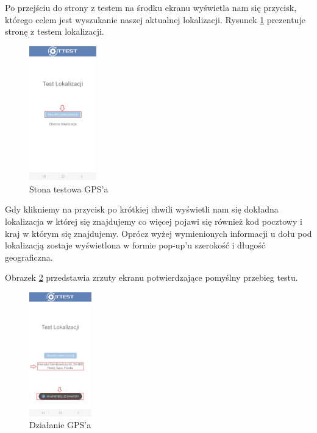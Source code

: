 Po przejściu do strony z testem na środku ekranu  wyświetla nam się przycisk, którego celem jest wyszukanie naszej aktualnej lokalizacji.
\newline
Rysunek \ref{rys:gps} prezentuje stronę z testem lokalizacji. 

\begin{figure}[!hbt]
	\begin{center}
		\includegraphics[angle=360, width=0.26\textwidth]{rys/punkt6/gps}
		\caption{Stona testowa GPS'a}
		\label{rys:gps}
	\end{center}
\end{figure}

\newpage


Gdy klikniemy na przycisk po krótkiej chwili wyświetli nam się dokładna lokalizacja w której się znajdujemy co więcej pojawi się również kod pocztowy i kraj w którym się znajdujemy.
\newline
Oprócz wyżej wymienionych informacji u dołu pod lokalizacją zostaje wyświetlona w formie pop-up'u szerokość i długość geograficzna.

Obrazek \ref{rys:gps1} przedstawia zrzuty ekranu potwierdzające pomyślny przebieg testu.
\begin{figure}[!hbt]
	\begin{center}
		\includegraphics[angle=360, width=0.24\textwidth]{rys/punkt6/gps1}
		\caption{Działanie GPS'a}
		\label{rys:gps1}
	\end{center}
\end{figure}

